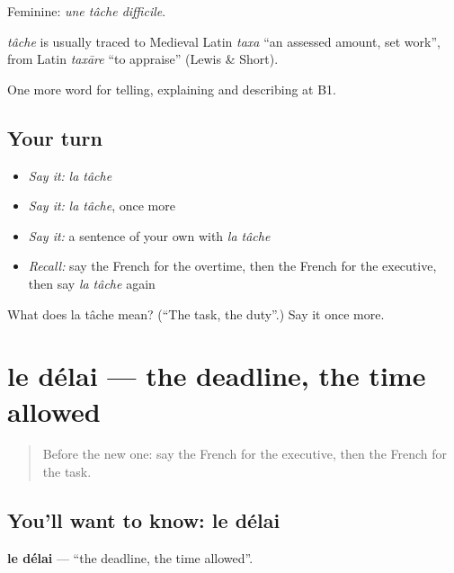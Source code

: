 Feminine: \emph{une tâche difficile}.

\begin{cousinweb}
\emph{tâche} is usually traced to Medieval Latin \emph{taxa} \textquotedblleft{}an assessed amount, set work\textquotedblright{}, from Latin \emph{taxāre} \textquotedblleft{}to appraise\textquotedblright{} (Lewis \& Short).
\end{cousinweb}

\begin{grammarlens}[title={What you've built}]
One more word for telling, explaining and describing at B1.
\end{grammarlens}

\subsection*{Your turn}
\begin{itemize}
\raggedright
  \item \emph{Say it:} \emph{la tâche}
  \item \emph{Say it:} \emph{la tâche}, once more
  \item \emph{Say it:} a sentence of your own with \emph{la tâche}
  \item \emph{Recall:} say the French for the overtime, then the French for the executive, then say \emph{la tâche} again
\end{itemize}

\begin{tcolorbox}[breakable,colback=teal!4,colframe=teal!35!black,title={Before you move on}]
What does la tâche mean? (\textquotedblleft{}The task, the duty\textquotedblright{}.) Say it once more.
\end{tcolorbox}
\section[le délai]{le délai — the deadline, the time allowed}

\label{lesson:FR-C359-delai}



\begin{quote}
Before the new one: say the French for the executive, then the French for the task.
\end{quote}

\subsection*{You'll want to know: le délai}
\textbf{le délai} — \textquotedblleft{}the deadline, the time allowed\textquotedblright{}.

